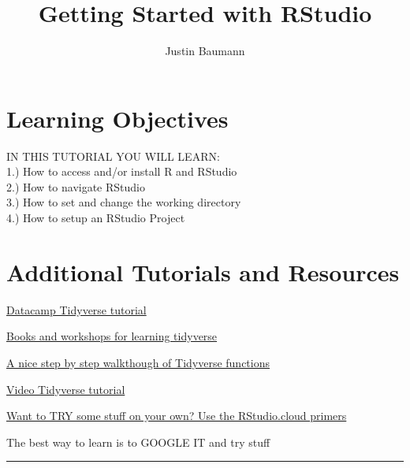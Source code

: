 \documentclass[
  letterpaper,
  DIV=11,
  numbers=noendperiod]{scrartcl}
\title{Getting Started with RStudio}
\author{Justin Baumann}
\date{}
\renewcommand*\contentsname{Table of contents}
\newcommand\contentsname{Table of contents}
\begin{document}
\maketitle
\ifdefined\Shaded\renewenvironment{Shaded}{\begin{tcolorbox}[frame hidden, breakable, boxrule=0pt, sharp corners, borderline west={3pt}{0pt}{shadecolor}, enhanced, interior hidden]}{\end{tcolorbox}}\fi

\renewcommand*\contentsname{Table of contents}
{
\hypersetup{linkcolor=}
\setcounter{tocdepth}{3}
\tableofcontents
}
\hypertarget{learning-objectives}{%
\section{\texorpdfstring{\textbf{Learning
Objectives}}{Learning Objectives}}\label{learning-objectives}}

IN THIS TUTORIAL YOU WILL LEARN:\\
1.) How to access and/or install R and RStudio\\
2.) How to navigate RStudio\\
3.) How to set and change the working directory\\
4.) How to setup an RStudio Project

\hypertarget{additional-tutorials-and-resources}{%
\section{Additional Tutorials and
Resources}\label{additional-tutorials-and-resources}}

\href{https://www.datacamp.com/community/tutorials/tidyverse-tutorial-r}{Datacamp
Tidyverse tutorial}

\href{https://www.tidyverse.org/learn/}{Books and workshops for learning
tidyverse}

\href{https://and.netlify.app/tutorials/02/}{A nice step by step
walkthough of Tidyverse functions}

\href{https://www.youtube.com/watch?v=JtQfXY0lIzc}{Video Tidyverse
tutorial}

\href{https://rstudio.cloud/learn/primers}{Want to TRY some stuff on
your own? Use the RStudio.cloud primers}

The best way to learn is to GOOGLE IT and try stuff

\begin{center}\rule{0.5\linewidth}{0.5pt}\end{center}
\end{document}
